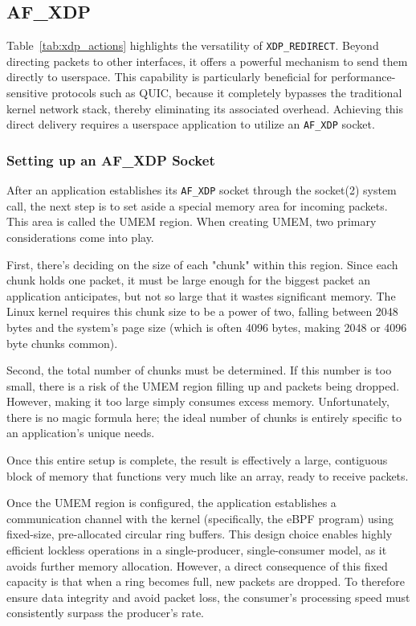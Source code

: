 \subsection{AF\_XDP}
\label{sec:af-xdp}
Table~\ref{tab:xdp_actions} highlights the versatility of \texttt{XDP\_REDIRECT}. Beyond directing packets to other interfaces, it offers a powerful mechanism to send them directly to userspace. This capability is particularly beneficial for performance-sensitive protocols such as QUIC, because it completely bypasses the traditional kernel network stack, thereby eliminating its associated overhead. Achieving this direct delivery requires a userspace application to utilize an \texttt{AF\_XDP} socket.

\subsubsection{Setting up an AF\_XDP Socket}
\label{subsec:af-xdp-socket}
After an application establishes its \texttt{AF\_XDP} socket through the socket(2) system call, the next step is to set aside a special memory area for incoming packets. This area is called the UMEM region. When creating UMEM, two primary considerations come into play.

First, there's deciding on the size of each "chunk" within this region. Since each chunk holds one packet, it must be large enough for the biggest packet an application anticipates, but not so large that it wastes significant memory. The Linux kernel requires this chunk size to be a power of two, falling between 2048 bytes and the system's page size (which is often 4096 bytes, making 2048 or 4096 byte chunks common).

Second, the total number of chunks must be determined. If this number is too small, there is a risk of the UMEM region filling up and packets being dropped. However, making it too large simply consumes excess memory. Unfortunately, there is no magic formula here; the ideal number of chunks is entirely specific to an application's unique needs.

Once this entire setup is complete, the result is effectively a large, contiguous block of memory that functions very much like an array, ready to receive packets.

Once the UMEM region is configured, the application establishes a communication channel with the kernel (specifically, the \ac{eBPF} program) using fixed-size, pre-allocated circular ring buffers. This design choice enables highly efficient lockless operations in a single-producer, single-consumer model, as it avoids further memory allocation. However, a direct consequence of this fixed capacity is that when a ring becomes full, new packets are dropped. To therefore ensure data integrity and avoid packet loss, the consumer's processing speed must consistently surpass the producer's rate.

